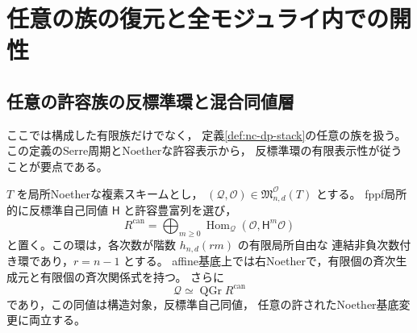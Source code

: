 \section{任意の族の復元と全モジュライ内での開性}
\label{sec:open-full-moduli}

\subsection{任意の許容族の反標準環と混合同値層}

ここでは構成した有限族だけでなく，
定義\ref{def:nc-dp-stack}の任意の族を扱う。
この定義のSerre周期とNoetherな許容表示から，
反標準環の有限表示性が従うことが要点である。

\begin{lemma}[Serre周期からの有限表示反標準環]
\label{lem:arbitrary-anticanonical-finite-presentation}
$T$ を局所Noetherな複素スキームとし，
$(\mathcal Q,\mathcal O)\in\mathfrak M^{\mathcal O}_{n,d}(T)$ とする。
fppf局所的に反標準自己同値 $\mathsf H$ と許容豊富列を選び，
\[
 R^{\mathrm{can}}=\bigoplus_{m\ge0}
 \operatorname{Hom}_{\mathcal Q}(\mathcal O,\mathsf H^m\mathcal O)
\]
と置く。この環は，各次数が階数 $h_{n,d}(rm)$ の有限局所自由な
連結非負次数付き環であり，$r=n-1$ とする。
affine基底上では右Noetherで，有限個の斉次生成元と有限個の斉次関係式を持つ。
さらに
\[
 \mathcal Q\simeq\operatorname{QGr}R^{\mathrm{can}}
\]
であり，この同値は構造対象，反標準自己同値，
任意の許されたNoether基底変更に両立する。
\end{lemma}
